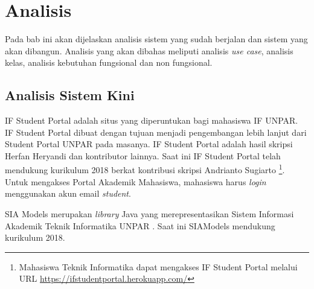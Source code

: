 \chapter{Analisis}
\label{chap:analisis}

Pada bab ini akan dijelaskan analisis sistem yang sudah berjalan dan sistem yang akan dibangun. Analisis yang akan dibahas meliputi analisis \textit{use case}, analisis kelas, analisis kebutuhan fungsional dan non fungsional.

\section{Analisis Sistem Kini}
% 

IF Student Portal adalah situs yang diperuntukan bagi mahasiswa IF UNPAR\cite{ifstudentportalunpar}. IF Student Portal dibuat dengan tujuan menjadi pengembangan lebih lanjut dari Student Portal UNPAR pada masanya. IF Student Portal adalah hasil skripsi Herfan Heryandi \cite{herfan:15:portal} dan kontributor lainnya. Saat ini IF Student Portal telah mendukung kurikulum 2018 berkat kontribusi skripsi Andrianto Sugiarto \cite{andrianto:18:portalsiam}\footnote{Mahasiswa Teknik Informatika dapat mengakses IF Student Portal melalui URL \url{https://ifstudentportal.herokuapp.com/}}. Untuk mengakses Portal Akademik Mahasiswa, mahasiswa harus \textit{login} menggunakan akun email \textit{student}. 

SIA Models merupakan \textit{library} Java yang merepresentasikan Sistem Informasi Akademik Teknik Informatika UNPAR \cite{siamodels}. Saat ini SIAModels mendukung kurikulum 2018. 

